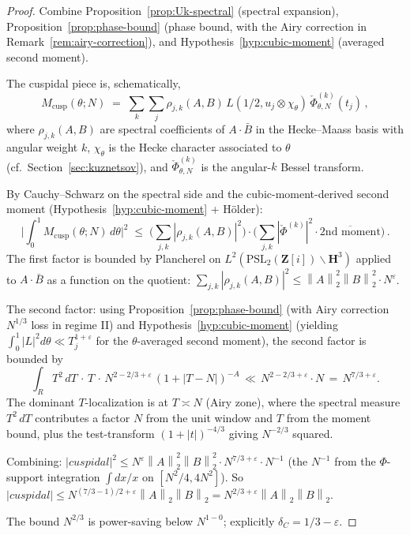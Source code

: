 \documentclass[11pt]{article}
\theoremstyle{definition}
\newcommand{\Z}{\mathbf{Z}}
\newcommand{\HH}{\mathbf{H}}
\newcommand{\Zi}{\Z[i]}
\newcommand{\norm}[1]{\left\lVert #1\right\rVert}
\begin{document}
\begin{proof}
Combine Proposition~\ref{prop:Uk-spectral} (spectral expansion), Proposition~\ref{prop:phase-bound} (phase bound, with the Airy correction in Remark~\ref{rem:airy-correction}), and Hypothesis~\ref{hyp:cubic-moment} (averaged second moment).

The cuspidal piece is, schematically,
\[
   M_{\text{cusp}}(\theta;N)\;=\;\sum_k\sum_j\rho_{j,k}(A,B)\,L(1/2,u_j\otimes\chi_\theta)\,\check\Phi_{\theta,N}^{(k)}(t_j)\,,
\]
where $\rho_{j,k}(A,B)$ are spectral coefficients of $A\cdot\bar B$ in the Hecke--Maass basis with angular weight $k$, $\chi_\theta$ is the Hecke character associated to $\theta$ (cf.~Section~\ref{sec:kuznetsov}), and $\check\Phi^{(k)}_{\theta,N}$ is the angular-$k$ Bessel transform.

By Cauchy--Schwarz on the spectral side and the cubic-moment-derived second moment (Hypothesis~\ref{hyp:cubic-moment} + Hölder):
\[
   \Big|\int_0^1 M_{\text{cusp}}(\theta;N)\,d\theta\Big|^2\;\le\;\Big(\sum_{j,k}|\rho_{j,k}(A,B)|^2\Big)\cdot\Big(\sum_{j,k}|\check\Phi^{(k)}|^2\cdot\overline{\text{2nd moment}}\Big)\,.
\]
The first factor is bounded by Plancherel on $L^2(\mathrm{PSL}_2(\Zi)\backslash\HH^3)$ applied to $A\cdot\bar B$ as a function on the quotient: $\sum_{j,k}|\rho_{j,k}(A,B)|^2\le\norm{A}_2^2\norm{B}_2^2\cdot N^\varepsilon$.

The second factor: using Proposition~\ref{prop:phase-bound} (with Airy correction $N^{1/3}$ loss in regime II) and Hypothesis~\ref{hyp:cubic-moment} (yielding $\int_0^1|L|^2 d\theta\ll T_j^{1+\varepsilon}$ for the $\theta$-averaged second moment), the second factor is bounded by
\[
   \int_R T^2\,dT\,\cdot\,T\,\cdot\,N^{2-2/3+\varepsilon}\,(1+|T-N|)^{-A}\,\ll\,N^{2-2/3+\varepsilon}\cdot N\,=\,N^{7/3+\varepsilon}.
\]
The dominant $T$-localization is at $T\asymp N$ (Airy zone), where the spectral measure $T^2\,dT$ contributes a factor $N$ from the unit window and $T$ from the moment bound, plus the test-transform $(1+|t|)^{-4/3}$ giving $N^{-2/3}$ squared.

Combining: $|cuspidal|^2\le N^\varepsilon\norm{A}_2^2\norm{B}_2^2\cdot N^{7/3+\varepsilon}\cdot N^{-1}$ (the $N^{-1}$ from the $\Phi$-support integration $\int dx/x$ on $[N^2/4,4N^2]$). So $|cuspidal|\le N^{(7/3-1)/2+\varepsilon}\norm{A}_2\norm{B}_2=N^{2/3+\varepsilon}\norm{A}_2\norm{B}_2$.

The bound $N^{2/3}$ is power-saving below $N^{1-0}$; explicitly $\delta_C=1/3-\varepsilon$.
\end{proof}
\end{document}
